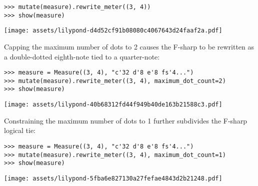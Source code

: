 \begin{comment}
<abjad>
mutate(measure).rewrite_meter((3, 4))
show(measure)
</abjad>
\end{comment}

\begin{abjadbookoutput}
\begin{singlespacing}
\vspace{-0.5\baselineskip}
\begin{lstlisting}
>>> mutate(measure).rewrite_meter((3, 4))
>>> show(measure)
\end{lstlisting}
\noindent\texttt{[image: assets/lilypond-d4d52cf91b08080c4067643d24faaf2a.pdf]}
\end{singlespacing}
\end{abjadbookoutput}

\noindent Capping the maximum number of dots to 2 causes the F-sharp to be
rewritten as a double-dotted eighth-note tied to a quarter-note:

\begin{comment}
<abjad>
measure = Measure((3, 4), "c'32 d'8 e'8 fs'4...")
mutate(measure).rewrite_meter((3, 4), maximum_dot_count=2)
show(measure)
</abjad>
\end{comment}

\begin{abjadbookoutput}
\begin{singlespacing}
\vspace{-0.5\baselineskip}
\begin{lstlisting}
>>> measure = Measure((3, 4), "c'32 d'8 e'8 fs'4...")
>>> mutate(measure).rewrite_meter((3, 4), maximum_dot_count=2)
>>> show(measure)
\end{lstlisting}
\noindent\texttt{[image: assets/lilypond-40b68312fd44f949b40de163b21588c3.pdf]}
\end{singlespacing}
\end{abjadbookoutput}

\noindent Constraining the maximum number of dots to 1 further subdivides the
F-sharp logical tie:

\begin{comment}
<abjad>
measure = Measure((3, 4), "c'32 d'8 e'8 fs'4...")
mutate(measure).rewrite_meter((3, 4), maximum_dot_count=1)
show(measure)
</abjad>
\end{comment}

\begin{abjadbookoutput}
\begin{singlespacing}
\vspace{-0.5\baselineskip}
\begin{lstlisting}
>>> measure = Measure((3, 4), "c'32 d'8 e'8 fs'4...")
>>> mutate(measure).rewrite_meter((3, 4), maximum_dot_count=1)
>>> show(measure)
\end{lstlisting}
\noindent\texttt{[image: assets/lilypond-5fba6e827130a27fefae4843d2b21248.pdf]}
\end{singlespacing}
\end{abjadbookoutput}

